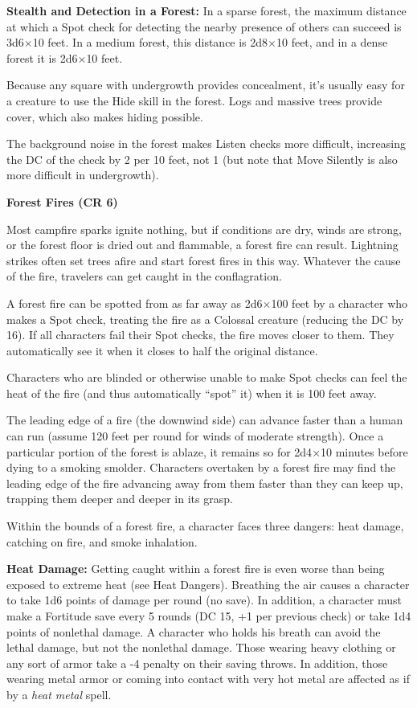 \documentclass{article}
\begin{document}
\textbf{Stealth and Detection in a Forest:} In a sparse forest, the maximum distance 
at which a Spot check for detecting the nearby presence of others can succeed is 
3d6\ensuremath{\times}10 feet. In a medium forest, this distance is 2d8\ensuremath{\times}10 
feet, and in a dense forest it is 2d6\ensuremath{\times}10 feet.

Because any square with undergrowth provides concealment, it's usually easy for 
a creature to use the Hide skill in the forest. Logs and massive trees provide 
cover, which also makes hiding possible.

The background noise in the forest makes Listen checks more difficult, increasing 
the DC of the check by 2 per 10 feet, not 1 (but note that Move Silently is also 
more difficult in undergrowth). 

\vspace{12pt}
\textbf{Forest Fires (CR 6)}

Most campfire sparks ignite nothing, but if conditions are dry, winds are strong, 
or the forest floor is dried out and flammable, a forest fire can result. Lightning 
strikes often set trees afire and start forest fires in this way. Whatever the 
cause of the fire, travelers can get caught in the conflagration.

A forest fire can be spotted from as far away as 2d6\ensuremath{\times}100 feet 
by a character who makes a Spot check, treating the fire as a Colossal creature 
(reducing the DC by 16). If all characters fail their Spot checks, the fire moves 
closer to them. They automatically see it when it closes to half the original distance.

Characters who are blinded or otherwise unable to make Spot checks can feel the 
heat of the fire (and thus automatically ``spot'' it) when it is 100 feet away.

The leading edge of a fire (the downwind side) can advance faster than a human 
can run (assume 120 feet per round for winds of moderate strength). Once a particular 
portion of the forest is ablaze, it remains so for 2d4\ensuremath{\times}10 minutes 
before dying to a smoking smolder. Characters overtaken by a forest fire may find 
the leading edge of the fire advancing away from them faster than they can keep 
up, trapping them deeper and deeper in its grasp.

Within the bounds of a forest fire, a character faces three dangers: heat damage, 
catching on fire, and smoke inhalation. 

\textbf{Heat Damage:} Getting caught within a forest fire is even worse than being 
exposed to extreme heat (see Heat Dangers). Breathing the air causes a character 
to take 1d6 points of damage per round (no save). In addition, a character must 
make a Fortitude save every 5 rounds (DC 15, +1 per previous check) or take 1d4 
points of nonlethal damage. A character who holds his breath can avoid the lethal 
damage, but not the nonlethal damage. Those wearing heavy clothing or any sort 
of armor take a -4 penalty on their saving throws. In addition, those wearing metal 
armor or coming into contact with very hot metal are affected as if by a \textit{heat 
metal }spell.
\end{document}
